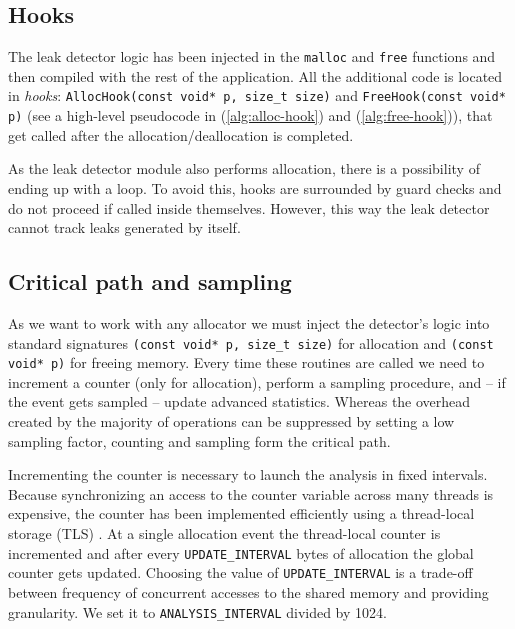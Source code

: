 \documentclass[preprint, numbers]{sigplanconf}
\newcommand{\todo}[1]{{\color{red}{(TODO: #1)}}}
\begin{document}
\subsection{Hooks}

The leak detector logic has been injected in the \texttt{malloc} and \texttt{free} functions
and then compiled with the rest of the application.
All the additional code is located in \textit{hooks}: \texttt{AllocHook(const void*~p, size\_t size)}
and \texttt{FreeHook(const void* p)}
(see a high-level pseudocode in (\ref{alg:alloc-hook}) and (\ref{alg:free-hook})),
that get called after the allocation/deallocation is completed.

As the leak detector module also performs allocation, there is a possibility
of ending up with a loop.
To avoid this, hooks are surrounded by guard checks and do not proceed
if called inside themselves.
However, this way the leak detector cannot track leaks generated by itself.

\subsection{Critical path and sampling}

As we want to work with any allocator we must inject the detector's logic into
standard signatures \texttt{(const void* p, size\_t size)} for allocation and
\texttt{(const void* p)} for freeing memory.
Every time these routines are called we need to increment a counter (only for allocation),
perform a sampling procedure, and -- if the event gets sampled -- update advanced statistics.
Whereas the overhead created by the majority of operations can be suppressed by setting a low
sampling factor, counting and sampling form the critical path.

Incrementing the counter is necessary to launch the analysis in fixed intervals.
Because synchronizing an access to the counter variable across many threads is expensive,
the counter has been implemented efficiently using a thread-local storage (TLS) \todo{cite?}.
At a single allocation event the thread-local counter is incremented and after every \texttt{UPDATE\_INTERVAL}
bytes of allocation the global counter gets updated.
Choosing the value of \texttt{UPDATE\_INTERVAL} is a trade-off between frequency of concurrent accesses
to the shared memory and providing granularity.
We set it to \texttt{ANALYSIS\_INTERVAL} divided by 1024.
\end{document}
